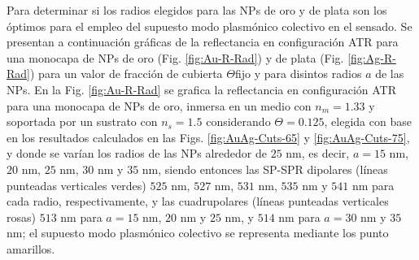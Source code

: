 Para determinar si los radios elegidos para las NPs de oro y de plata son los óptimos para el empleo del supuesto modo plasmónico colectivo en el sensado. Se presentan a continuación 	gráficas de la reflectancia en configuración ATR para una monocapa de NPs de oro (Fig. \ref{fig:Au-R-Rad}) y de plata (Fig. \ref{fig:Ag-R-Rad}) para un valor de fracción de cubierta $\Theta $fijo y para disintos radios $a$ de las NPs. En la Fig. \ref{fig:Au-R-Rad} se grafica la reflectancia en configuración ATR para una monocapa de NPs de oro, inmersa en un medio con $n_m=1.33$ y soportada por un sustrato con $n_s=1.5$ considerando  $\Theta=0.125$, elegida con base en los resultados calculados en las Figs. \ref{fig:AuAg-Cuts-65} y \ref{fig:AuAg-Cuts-75}, y donde se varían los radios de las NPs alrededor de $25$ nm, es decir, $a=15$ nm, $20$ nm, $25$ nm, $30$ nm y $35$ nm, siendo entonces las SP-SPR dipolares (líneas punteadas verticales verdes) $525$ nm, $527$ nm, $531$ nm, $535$ nm y $541$ nm para cada radio, respectivamente, y las cuadrupolares (líneas punteadas verticales rosas) $513$ nm para $a=15$ nm, $20$ nm y $25$ nm, y $514$ nm para $a=30$ nm y $35$ nm; el supuesto modo plasmónico colectivo se representa mediante los punto amarillos.

